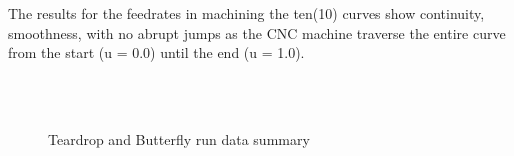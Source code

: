 The results for the feedrates in machining the ten(10) curves show continuity, smoothness, with no abrupt jumps as the CNC machine traverse the entire curve from the start (u = 0.0) until the end (u = 1.0).	\vspace*{1\baselineskip}
		


















\pagebreak

\begin{figure}[htbp]
\begin{center}
	\\
	\\
	\caption{Teardrop and Butterfly run data summary}
	\label{fig:Teardrop and Butterfly run data summary.png}
\end{center}
\end{figure}


